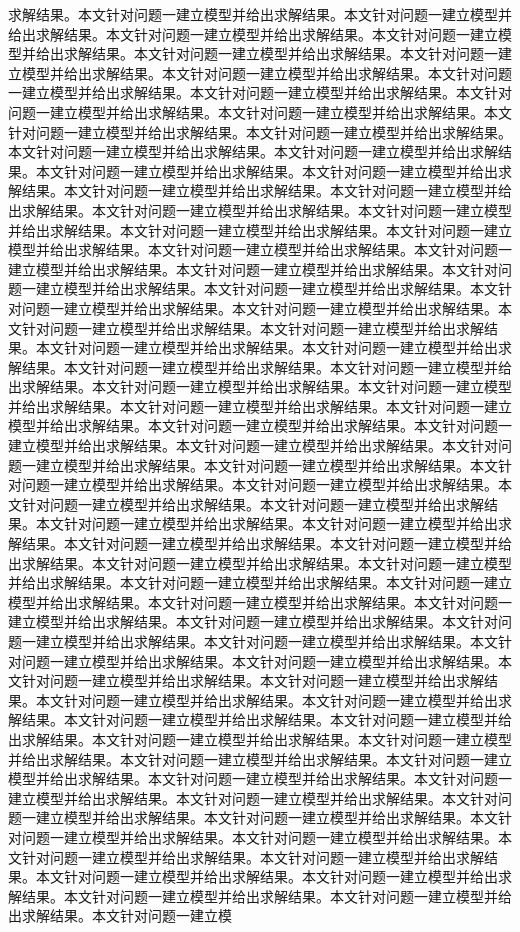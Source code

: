 求解结果。本文针对问题一建立模型并给出求解结果。本文针对问题一建立模型并给出求解结果。本文针对问题一建立模型并给出求解结果。本文针对问题一建立模型并给出求解结果。本文针对问题一建立模型并给出求解结果。本文针对问题一建立模型并给出求解结果。本文针对问题一建立模型并给出求解结果。本文针对问题一建立模型并给出求解结果。本文针对问题一建立模型并给出求解结果。本文针对问题一建立模型并给出求解结果。本文针对问题一建立模型并给出求解结果。本文针对问题一建立模型并给出求解结果。本文针对问题一建立模型并给出求解结果。本文针对问题一建立模型并给出求解结果。本文针对问题一建立模型并给出求解结果。本文针对问题一建立模型并给出求解结果。本文针对问题一建立模型并给出求解结果。本文针对问题一建立模型并给出求解结果。本文针对问题一建立模型并给出求解结果。本文针对问题一建立模型并给出求解结果。本文针对问题一建立模型并给出求解结果。本文针对问题一建立模型并给出求解结果。本文针对问题一建立模型并给出求解结果。本文针对问题一建立模型并给出求解结果。本文针对问题一建立模型并给出求解结果。本文针对问题一建立模型并给出求解结果。本文针对问题一建立模型并给出求解结果。本文针对问题一建立模型并给出求解结果。本文针对问题一建立模型并给出求解结果。本文针对问题一建立模型并给出求解结果。本文针对问题一建立模型并给出求解结果。本文针对问题一建立模型并给出求解结果。本文针对问题一建立模型并给出求解结果。本文针对问题一建立模型并给出求解结果。本文针对问题一建立模型并给出求解结果。本文针对问题一建立模型并给出求解结果。本文针对问题一建立模型并给出求解结果。本文针对问题一建立模型并给出求解结果。本文针对问题一建立模型并给出求解结果。本文针对问题一建立模型并给出求解结果。本文针对问题一建立模型并给出求解结果。本文针对问题一建立模型并给出求解结果。本文针对问题一建立模型并给出求解结果。本文针对问题一建立模型并给出求解结果。本文针对问题一建立模型并给出求解结果。本文针对问题一建立模型并给出求解结果。本文针对问题一建立模型并给出求解结果。本文针对问题一建立模型并给出求解结果。本文针对问题一建立模型并给出求解结果。本文针对问题一建立模型并给出求解结果。本文针对问题一建立模型并给出求解结果。本文针对问题一建立模型并给出求解结果。本文针对问题一建立模型并给出求解结果。本文针对问题一建立模型并给出求解结果。本文针对问题一建立模型并给出求解结果。本文针对问题一建立模型并给出求解结果。本文针对问题一建立模型并给出求解结果。本文针对问题一建立模型并给出求解结果。本文针对问题一建立模型并给出求解结果。本文针对问题一建立模型并给出求解结果。本文针对问题一建立模型并给出求解结果。本文针对问题一建立模型并给出求解结果。本文针对问题一建立模型并给出求解结果。本文针对问题一建立模型并给出求解结果。本文针对问题一建立模型并给出求解结果。本文针对问题一建立模型并给出求解结果。本文针对问题一建立模型并给出求解结果。本文针对问题一建立模型并给出求解结果。本文针对问题一建立模型并给出求解结果。本文针对问题一建立模型并给出求解结果。本文针对问题一建立模型并给出求解结果。本文针对问题一建立模型并给出求解结果。本文针对问题一建立模型并给出求解结果。本文针对问题一建立模型并给出求解结果。本文针对问题一建立模型并给出求解结果。本文针对问题一建立模型并给出求解结果。本文针对问题一建立模型并给出求解结果。本文针对问题一建立模型并给出求解结果。本文针对问题一建立模型并给出求解结果。本文针对问题一建立模型并给出求解结果。本文针对问题一建立模型并给出求解结果。本文针对问题一建立模型并给出求解结果。本文针对问题一建立模型并给出求解结果。本文针对问题一建立模型并给出求解结果。本文针对问题一建立模型并给出求解结果。本文针对问题一建立模型并给出求解结果。本文针对问题一建立模型并给出求解结果。本文针对问题一建立模